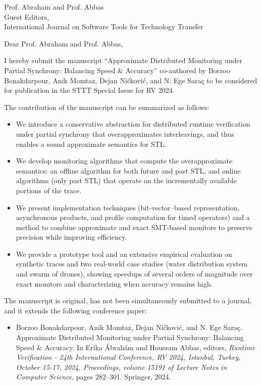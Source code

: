 \documentclass[10pt]{letter}
\date{\today}
\begin{document}
	\begin{letter}
		{
			Prof. Abraham and Prof. Abbas\\
			Guest Editors,\\
			International Journal on Software Tools for Technology Transfer
		}
		
		\opening{Dear Prof. Abraham and Prof. Abbas,}
		
		I hereby submit the manuscript ``Approximate Distributed Monitoring under Partial Synchrony: Balancing Speed \& Accuracy'' co-authored by Borzoo Bonakdarpour, Anik Momtaz, Dejan Ni\v{c}kovi\'{c}, and N. Ege Sara\c{c} to be considered for publication in the STTT Special Issue for RV 2024.
		
		The contribution of the manuscript can be summarized as follows:
		\begin{itemize}[noitemsep]
			\item We introduce a conservative abstraction for distributed runtime verification under partial synchrony that overapproximates interleavings, and thus enables a sound approximate semantics for STL.
			\item We develop monitoring algorithms that compute the overapproximate semantics: an offline algorithm for both future and past STL, and online algorithms (only past STL) that operate on the incrementally available portions of the trace.
			\item We present implementation techniques (bit-vector–based representation, asynchronous products, and profile computation for timed operators) and a method to combine approximate and exact SMT-based monitors to preserve precision while improving efficiency.
			\item We provide a prototype tool and an extensive empirical evaluation on synthetic traces and two real-world case studies (water distribution system and swarm of drones), showing speedups of several orders of magnitude over exact monitors and characterizing when accuracy remains high.
		\end{itemize}
		
		The manuscript is original, has not been simultaneously submitted to a journal, and it extends the following conference paper:
		\begin{itemize}
			\item Borzoo Bonakdarpour, Anik Momtaz, Dejan Ni\v{c}kovi\'{c}, and N. Ege Sara\c{c}. Approximate Distributed Monitoring under Partial Synchrony: Balancing Speed \& Accuracy. In Erika Ábrahám and Houssam Abbas, editors, \emph{Runtime Verification - 24th International Conference, RV 2024, Istanbul, Turkey, October 15-17, 2024, Proceedings, volume 15191 of Lecture Notes in Computer Science}, pages 282–301. Springer, 2024.
		\end{itemize}
				

\end{letter}
\end{document}

